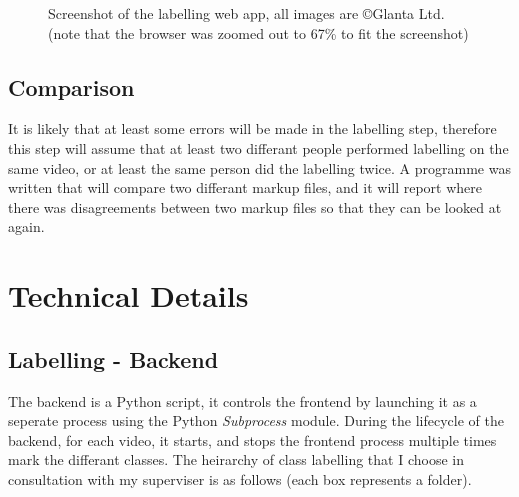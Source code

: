     \begin{figure}[h]
        \centering
        \caption{Screenshot of the labelling web app, all images are \copyright \space Glanta Ltd. (note that the browser was zoomed out to 67\% to fit the screenshot)}
        \label{fig:markupscreenshot}
    \end{figure}

    \subsection{Comparison} 
    It is likely that at least some errors will be made in the labelling step, therefore this step will assume that at least two differant people performed labelling on the same video, or at least the same person did the labelling twice. A programme was written that will compare two differant markup files, and it will report where there was disagreements between two markup files so that they can be looked at again.

\section{Technical Details}
    \subsection{Labelling - Backend}
    The backend is a Python script, it controls the frontend by launching it as a seperate process using the Python {\slshape Subprocess} module. During the lifecycle of the backend, for each video, it starts, and stops the frontend process multiple times mark the differant classes. The heirarchy of class labelling that I choose in consultation with my superviser is as follows (each box represents a folder).\\

